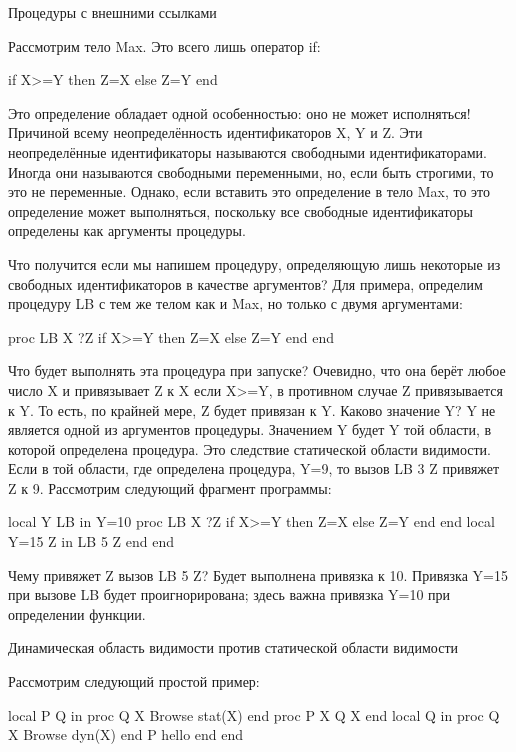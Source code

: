 Процедуры с внешними ссылками

Рассмотрим тело Max. Это всего лишь оператор if:

if X>=Y then Z=X else Z=Y end

Это определение обладает одной особенностью: оно не может исполняться! Причиной всему неопределённость идентификаторов X, Y и Z. Эти неопределённые идентификаторы называются свободными идентификаторами. Иногда они называются свободными переменными, но, если быть строгими, то это не переменные. Однако, если вставить это определение в тело Max, то это определение может выполняться, поскольку все свободные идентификаторы определены как аргументы процедуры.

Что получится если мы напишем процедуру, определяющую лишь некоторые из свободных идентификаторов в качестве аргументов? Для примера, определим процедуру LB с тем же телом как и Max, но только с двумя аргументами:

proc {LB X ?Z}
if X>=Y then Z=X else Z=Y end
end

Что будет выполнять эта процедура при запуске? Очевидно, что она берёт любое число X и привязывает Z к X если X>=Y, в противном случае Z привязывается к Y. То есть, по крайней мере, Z будет привязан к Y. Каково значение Y? Y не является одной из аргументов процедуры. Значением Y будет Y той области, в которой определена процедура. Это следствие статической области видимости. Если в той области, где определена процедура, Y=9, то вызов {LB 3 Z} привяжет Z к 9. Рассмотрим следующий фрагмент программы:

local Y LB in
Y=10
proc {LB X ?Z}
if X>=Y then Z=X else Z=Y end
end
local Y=15 Z in
{LB 5 Z}
end
end

Чему привяжет Z вызов {LB 5 Z}? Будет выполнена привязка к 10. Привязка Y=15 при вызове LB будет проигнорирована; здесь важна привязка Y=10 при определении функции.

Динамическая область видимости против статической области видимости

Рассмотрим следующий простой пример:

local P Q in
proc {Q X} {Browse stat(X)} end
proc {P X} {Q X} end
local Q in
proc {Q X} {Browse dyn(X)} end
{P hello}
end
end

